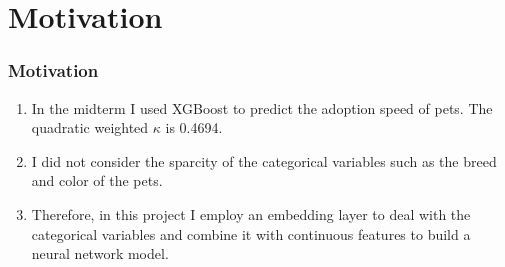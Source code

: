 

\section{Motivation}
\begin{frame}\frametitle{Motivation}
\begin{enumerate}
    \item In the midterm I used XGBoost to predict the adoption speed of pets. The quadratic weighted $\kappa$ is 0.4694. 
    \item I did not consider the sparcity of the categorical variables such as the breed and color of the pets.
    \item Therefore, in this project I employ an embedding layer to deal with the categorical variables and combine it with continuous features to build a neural network model.
\end{enumerate}

\end{frame}

